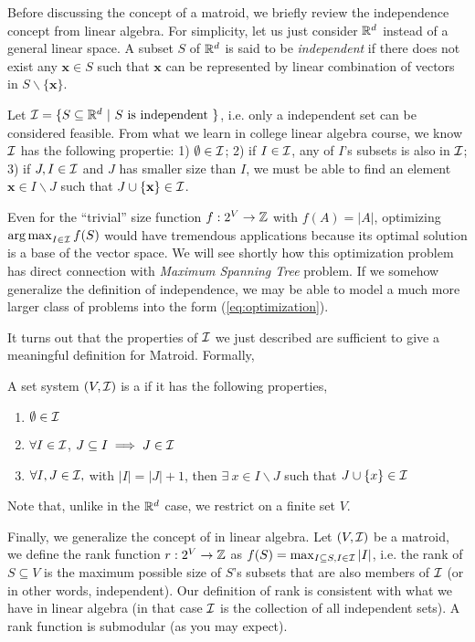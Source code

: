 Before discussing the concept of a matroid, we briefly review the independence concept from linear algebra. For simplicity, let us just consider $\mathbb{R}^d$ instead of a general linear space. A subset $S$ of $\mathbb{R}^d$ is said to be \emph{independent} if there does not exist any $\mathbf{x}\in S$ such that $\mathbf{x}$ can be represented by linear combination of vectors in $S\backslash\{\mathbf{x}\}$. 

Let $\mathcal{I} = \{S \subseteq \mathbb{R}^d~|~S ~\text{is independent}~\}$, i.e. only a independent set can be considered feasible. From what we learn in college linear algebra course, we know $\mathcal{I}$ has the following propertie: 1) $\emptyset \in \mathcal{I}$; 2) if $I\in \mathcal{I}$, any of $I$'s subsets is also in $\mathcal{I}$; 3) if $J, I\in \mathcal{I}$ and $J$ has smaller size than $I$, we must be able to find an element  $\mathbf{x} \in I\backslash J$ such that $J\cup \{\mathbf{x}\} \in \mathcal{I}$. 

Even for the ``trivial'' size function $f: 2^V \rightarrow \mathbb{Z}$ with $f(A) = |A|$, optimizing $\operatorname*{arg\,max}_{I\in\mathcal{I}} f(S)$ would have tremendous applications because its optimal solution is a base of the vector space. We will see shortly how this optimization problem has direct connection with \emph{Maximum Spanning Tree} problem. If we somehow generalize the definition of independence, we may be able to model a much more larger class of problems into the form (\ref{eq:optimization}). 

It turns out that the properties of $\mathcal{I}$ we just described are sufficient to give a meaningful definition for Matroid. Formally, 
\begin{definition}[Matroid]
\label{def:matroid}
  A set system $(V, \mathcal{I})$ is a  if it has the following properties,
  \begin{enumerate}
  \item $\emptyset \in \mathcal{I}$
  \item $\forall I \in \mathcal{I}$, $J\subseteq I \implies J\in \mathcal{I}$
  \item $\forall I, J \in \mathcal{I},$ with $|I| = |J| + 1$,  then $\exists~ x\in I\backslash J$ such that $J \cup \{x\}\in \mathcal{I}$ 
  \end{enumerate} 
\end{definition}
Note that, unlike in the $\mathbb{R}^d$ case, we restrict on a finite set $V$. 


Finally, we generalize the concept of  in linear algebra. Let $(V, \mathcal{I})$ be a matroid, we define the rank function $r: 2^V \rightarrow \mathbb{Z}$ as $f(S) = \max_{I\subseteq S, I\in \mathcal{I}} |I|$, i.e. the rank of $S\subseteq V$ is the maximum possible size of $S$'s subsets that are also members of $\mathcal{I}$ (or in other words, independent). Our definition of rank is consistent with what we have in linear algebra (in that case $\mathcal{I}$ is the collection of all independent sets). A rank function is submodular (as you may expect).



